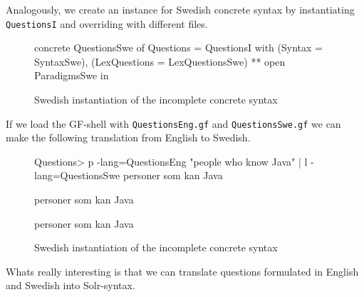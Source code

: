Analogously, we create an instance for Swedish concrete syntax by instantiating \texttt{QuestionsI} and overriding with different files.

\begin{figure}[H]
\begin{code}
concrete QuestionsSwe of Questions = QuestionsI with 
                                             (Syntax = SyntaxSwe), 
                                             (LexQuestions = LexQuestionsSwe) 
                                             ** open ParadigmsSwe in {}
\end{code}
\caption{Swedish instantiation of the incomplete concrete syntax}
\end{figure}

If we load the GF-shell with \texttt{QuestionsEng.gf} and \texttt{QuestionsSwe.gf} we can make the following translation from English to Swedish.

\begin{figure}[H]
\begin{code}
Questions> p -lang=QuestionsEng "people who know Java" | l -lang=QuestionsSwe
personer som kan Java

personer som kan Java

personer som kan Java

\end{code}
\caption{Swedish instantiation of the incomplete concrete syntax}
\end{figure}

 Whats really interesting is that we can translate questions formulated in English and Swedish into Solr-syntax.